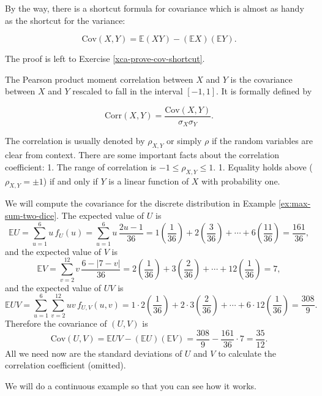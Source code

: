 \documentclass[]{book}
\numberwithin{equation}{chapter}
\numberwithin{figure}{chapter}
\theoremstyle{plain}
\theoremstyle{definition}
\theoremstyle{remark}
\theoremstyle{definition}
\theoremstyle{definition}
\theoremstyle{remark}
\let\BeginKnitrBlock\begin \let\EndKnitrBlock\end
\begin{document}
By the way, there is a shortcut formula for covariance which is almost
as handy as the shortcut for the variance:

\begin{equation}
\mbox{Cov}(X,Y)=\mathbb{E}(XY)-(\mathbb{E} X)(\mathbb{E} Y).
\end{equation}

The proof is left to Exercise \ref{xca-prove-cov-shortcut}.

The Pearson product moment correlation between \(X\) and \(Y\) is the
covariance between \(X\) and \(Y\) rescaled to fall in the interval
\([-1,1]\). It is formally defined by

\begin{equation}
\mbox{Corr}(X,Y)=\frac{\mbox{Cov}(X,Y)}{\sigma_{X}\sigma_{Y}}.
\end{equation}

The correlation is usually denoted by \(\rho_{X,Y}\) or simply \(\rho\)
if the random variables are clear from context. There are some important
facts about the correlation coefficient: 1. The range of correlation is
\(-1\leq\rho_{X,Y}\leq1\). 1. Equality holds above (\(\rho_{X,Y}=\pm1\))
if and only if \(Y\) is a linear function of \(X\) with probability one.

\bigskip

\BeginKnitrBlock{example}
\protect\hypertarget{ex:max-sum-dice-covariance}{}{\label{ex:max-sum-dice-covariance}}We
will compute the covariance for the discrete distribution in Example
\ref{ex:max-sum-two-dice}. The expected value of \(U\) is
\[ \mathbb{E} U=\sum_{u=1}^{6}u\,
f_{U}(u)=\sum_{u=1}^{6}u\,\frac{2u-1}{36}=1\left(\frac{1}{36}\right)+2\left(\frac{3}{36}\right)+\cdots+6\left(\frac{11}{36}\right)=\frac{161}{36},
\] and the expected value of \(V\) is \[ \mathbb{E}
V=\sum_{v=2}^{12}v\,\frac{6-|7-v|}{36}=2\left(\frac{1}{36}\right)+3\left(\frac{2}{36}\right)+\cdots+12\left(\frac{1}{36}\right)=7,
\] and the expected value of \(UV\) is \[ \mathbb{E}
UV=\sum_{u=1}^{6}\sum_{v=2}^{12}uv\,
f_{U,V}(u,v)=1\cdot2\left(\frac{1}{36}\right)+2\cdot3\left(\frac{2}{36}\right)+\cdots+6\cdot12\left(\frac{1}{36}\right)=\frac{308}{9}.
\] Therefore the covariance of \((U,V)\) is \[
\mbox{Cov}(U,V)=\mathbb{E} UV-\left(\mathbb{E}
U\right)\left(\mathbb{E}
V\right)=\frac{308}{9}-\frac{161}{36}\cdot7=\frac{35}{12}.
\] All we need now are the standard deviations of \(U\) and \(V\) to
calculate the correlation coefficient (omitted).
\EndKnitrBlock{example}

We will do a continuous example so that you can see how it works.
\end{document}
